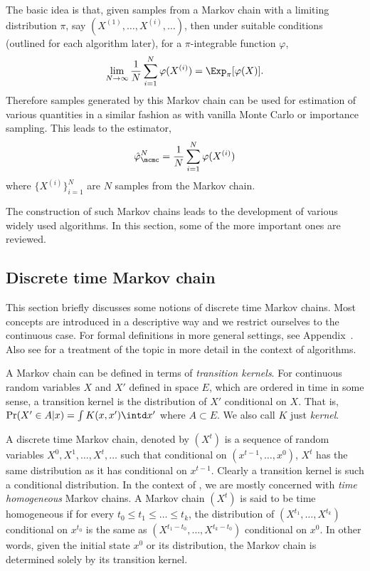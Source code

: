 The basic idea is that, given samples from a Markov chain with a limiting
distribution $\pi$, say $(X^{(1)},\dots,X^{(i)},\dots)$, then under suitable
conditions (outlined for each algorithm later), for a $\pi$-integrable
function $\varphi$,
\begin{equation}
  \lim_{N\to\infty}\frac{1}{N}\sum_{i=1}^N\varphi(X^{(i)}) =
  \Exp_{\pi}[\varphi(X)].
  \label{eq:mcmc convergence}
\end{equation}
Therefore samples generated by this Markov chain can be used for estimation
of various quantities in a similar fashion as with vanilla Monte Carlo or
importance sampling. This leads to the estimator,
\begin{equation}
  \hat\varphi_{\mcmc}^N = \frac{1}{N}\sum_{i=1}^N\varphi(X^{(i)})
  \label{eq:mcmc est}
\end{equation}
where $\{X^{(i)}\}_{i=1}^N$ are $N$ samples from the Markov chain.

The construction of such Markov chains leads to the development of various
widely used \mcmc algorithms. In this section, some of the more important
ones are reviewed.

\subsection{Discrete time Markov chain}
\label{sub:Discrete time Markov chain}

This section briefly discusses some notions of discrete time Markov chains.
Most concepts are introduced in a descriptive way and we restrict ourselves
to the continuous case. For formal definitions in more general settings, see
Appendix~. Also see
\cite[][chap.~6]{Robert:2004tn} for a treatment of the topic in more detail
in the context of \mcmc algorithms.

A Markov chain can be defined in terms of \emph{transition kernels}. For
continuous random variables $X$ and $X'$ defined in space $E$, which are
ordered in time in some sense, a transition kernel is the distribution of
$X'$ conditional on $X$. That is, $\Pr(X'\in A|x) = \int K(x,x')\intd x'$
where $A\subset E$. We also call $K$ just \emph{kernel}.

A discrete time Markov chain, denoted by $(X^t)$ is a sequence of random
variables $X^0,X^1,\dots,X^t,\dots$ such that conditional on
$(x^{t-1},\dots,x^0)$, $X^t$ has the same distribution as it has conditional
on $x^{t-1}$. Clearly a transition kernel is such a conditional distribution.
In the context of \mcmc, we are mostly concerned with \emph{time homogeneous}
Markov chains. A Markov chain $(X^t)$ is said to be time homogeneous if for
every $t_0\le t_1\le\dots\le t_k$, the distribution of
$(X^{t_1},\dots,X^{t_k})$ conditional on $x^{t_0}$ is the same as
$(X^{t_1-t_0},\dots,X^{t_k-t_0})$ conditional on $x^0$. In other words, given
the initial state $x^0$ or its distribution, the Markov chain is determined
solely by its transition kernel.

